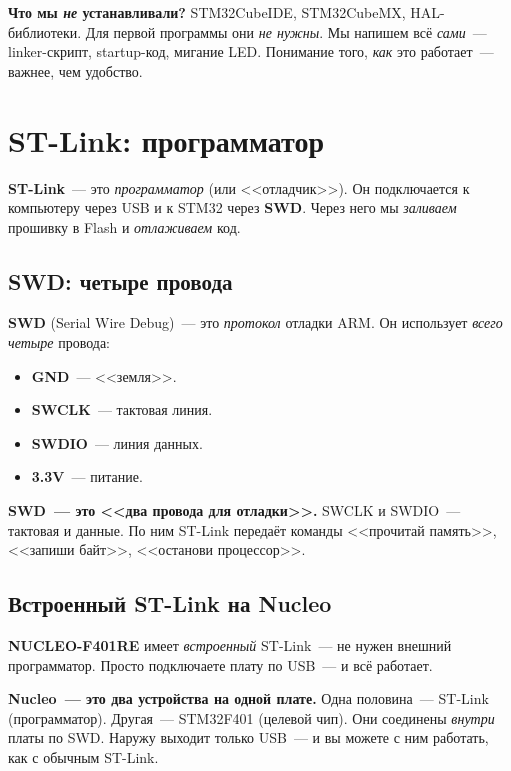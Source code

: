 \begin{keybox}
\textbf{Что мы \emph{не} устанавливали?} STM32CubeIDE,
STM32CubeMX, HAL-библиотеки. Для первой программы они
\emph{не нужны}. Мы напишем всё \emph{сами}~---
linker-скрипт, startup-код, мигание LED. Понимание
того, \emph{как} это работает~--- важнее, чем удобство.
\end{keybox}

\section{ST-Link: программатор}
\label{sec:flashing-stlink}

\textbf{ST-Link}~--- это \emph{программатор} (или
<<отладчик>>). Он подключается к компьютеру через USB
и к STM32 через \textbf{SWD}. Через него мы \emph{заливаем}
прошивку в Flash и \emph{отлаживаем} код.

\subsection{SWD: четыре провода}

\textbf{SWD} (Serial Wire Debug)~--- это \emph{протокол}
отладки ARM. Он использует \emph{всего четыре} провода:

\begin{itemize}
    \item \textbf{GND}~--- <<земля>>.
    \item \textbf{SWCLK}~--- тактовая линия.
    \item \textbf{SWDIO}~--- линия данных.
    \item \textbf{3.3V}~--- питание.
\end{itemize}

\begin{keybox}
\textbf{SWD~--- это <<два провода для отладки>>.}
SWCLK и SWDIO~--- тактовая и данные. По ним ST-Link
передаёт команды <<прочитай память>>, <<запиши байт>>,
<<останови процессор>>.
\end{keybox}

\subsection{Встроенный ST-Link на Nucleo}

\textbf{NUCLEO-F401RE} имеет \emph{встроенный} ST-Link~---
не нужен внешний программатор. Просто подключаете
плату по USB~--- и всё работает.

\begin{ideabox}
\textbf{Nucleo~--- это два устройства на одной плате.}
Одна половина~--- ST-Link (программатор). Другая~---
STM32F401 (целевой чип). Они соединены \emph{внутри}
платы по SWD. Наружу выходит только USB~---
и вы можете с ним работать, как с обычным ST-Link.
\end{ideabox}

